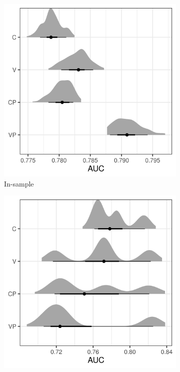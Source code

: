 \documentclass[12pt,letterpaper]{article}
\begin{document}
\begin{refsection}
\begin{figure}[ht]
 \begin{subfigure}[ht]{0.45\textwidth}
  \includegraphics[width=\textwidth,height=0.5\textheight,keepaspectratio=true]{../results/figure/auc_hist_full}
  \caption{In-sample}
  \label{fig:auc_hist}
 \end{subfigure}
 \begin{subfigure}[ht]{0.45\textwidth}
  \includegraphics[width=\textwidth,height=0.5\textheight,keepaspectratio=true]{../results/figure/fold_auc_full}

\end{subfigure}
\end{figure}
\end{refsection}
\end{document}
